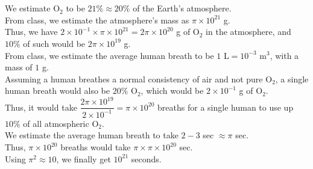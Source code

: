 \documentclass[11pt,a4paper,margin=1in]{article}
\begin{document}
\section{}
\begin{flushleft}
    We estimate $\text{O}_2$ to be $21\% \approx 20\%$ of the Earth's atmosphere.\\
    From class, we estimate the atmosphere's mass as $\pi\times10^{21}$ g.\\
    Thus, we have $2\times10^{-1}\times\pi\times10^{21} = 2\pi\times10^{20}$ g
        of $\text{O}_2$ in the atmosphere, and $10\%$ of such would be
        $2\pi\times10^{19}$ g.\\
    From class, we estimate the average human breath to be $1\text{ L} = 10^{-3}
        \text{ m}^{3}$, with a mass of $1$ g.\\
    Assuming a human breathes a normal consistency of air and not pure $\text{O}_2$,
        a single human breath would also be $20\%$ $\text{O}_2$, which would be
        $2\times10^{-1}$ g of $\text{O}_2$.\\
    Thus, it would take $\dfrac{2\pi\times10^{19}}{2\times10^{-1}} = \pi\times10^{20}$
        breaths for a single human to use up $10\%$ of all atmospheric $\text{O}_2$.\\
    We estimate the average human breath to take $2-3$ sec $\approx \pi$ sec.\\
    Thus, $\pi\times10^{20}$ breaths would take $\pi\times\pi\times10^{20}$ sec.\\
    Using $\pi^2 \approx 10$, we finally get $10^{21}$ seconds.
\end{flushleft}
\end{document}
